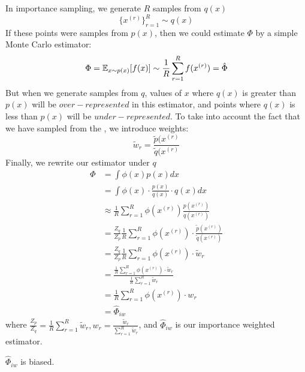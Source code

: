 \documentclass[11pt]{article}
\begin{document}
\noindent In importance sampling, we generate $R$ samples from $q(x)$
$$\{x^{(r)}\}_{r=1}^R \sim q(x)$$
If these points were samples from $p(x)$, then we could estimate $\Phi$ by a simple Monte Carlo estimator:
$$\Phi = \mathbb{E}_{x\sim p(x)}[f(x)] \sim \frac{1}{R}\sum_{r=1}^R f(x^{(r)}) = \hat{\Phi}$$
But when we generate samples from $q$, values of $x$ where $q(x)$ is greater than $p(x)$ will be $over-represented$ in this estimator, and points where $q(x)$ is less than $p(x)$ will be $under-represented$. To take into account the fact that we have sampled from the , we introduce weights:
$$\tilde{w}_r = \frac{\tilde{p}(x^{(r)}}{\tilde{q}(x^{(r)}}$$
Finally, we rewrite our estimator under $q$
\begin{align} 
 \Phi&=\int \phi(x) p(x) d x \\
&= \int \phi(x) \cdot \frac{p(x)}{q(x)} \cdot q(x) d x \\
&\approx  \frac{1}{R} \sum_{r=1}^{R} \phi\left(x^{(r)}\right) \frac{p\left(x^{(r)}\right)}{q\left(x^{(r)}\right)}\\
	&= \frac{Z_q}{Z_p} \frac{1}{R}\sum_{r=1}^R \phi(x^{(r)}) \cdot \frac{\tilde p(x^{(r)})}{\tilde q(x^{(r)})} \\ &= \frac{Z_q}{Z_p} \frac{1}{R}\sum_{r=1}^R \phi(x^{(r)}) \cdot \tilde w_r \\ &= \frac{\frac{1}{R}\sum_{r=1}^R \phi(x^{(r)}) \cdot \tilde w_r}{\frac{1}{R}\sum_{r=1}^R \tilde w_r} \\ &= \frac{1}{R}\sum_{r=1}^R \phi(x^{(r)}) \cdot w_r \\ &= \hat \Phi_{iw} \end{align}
where $\frac{Z_p}{Z_q} = \frac{1}{R}\sum_{r=1}^R\tilde{w}_r, w_r = \frac{\tilde{w}_r}{\sum_{r=1}^R \tilde{w}_r}$, and $\hat \Phi_{iw}$ is our importance weighted estimator.

\remark
$\hat \Phi_{iw}$ is biased.
\end{document}
